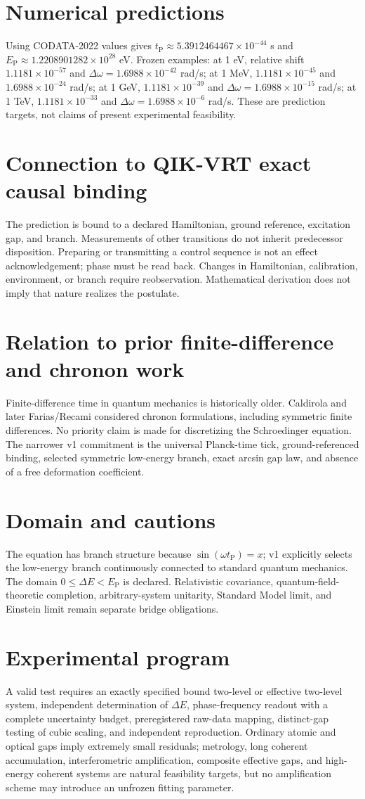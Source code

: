 \documentclass[11pt,a4paper]{article}
\newcommand{\tP}{t_{\mathrm P}}\newcommand{\EP}{E_{\mathrm P}}\newcommand{\dE}{\Delta E}\newcommand{\dw}{\Delta\omega}\newcommand{\repo}{\texttt{Goldkelch/qik-vrt}}
\begin{document}
\section{Numerical predictions}Using CODATA-2022 values gives $\tP\approx5.3912464467\times10^{-44}$ s and $\EP\approx1.2208901282\times10^{28}$ eV. Frozen examples: at 1 eV, relative shift $1.1181\times10^{-57}$ and $\dw=1.6988\times10^{-42}$ rad/s; at 1 MeV, $1.1181\times10^{-45}$ and $1.6988\times10^{-24}$ rad/s; at 1 GeV, $1.1181\times10^{-39}$ and $\dw=1.6988\times10^{-15}$ rad/s; at 1 TeV, $1.1181\times10^{-33}$ and $\dw=1.6988\times10^{-6}$ rad/s. These are prediction targets, not claims of present experimental feasibility.
\section{Connection to QIK-VRT exact causal binding}The prediction is bound to a declared Hamiltonian, ground reference, excitation gap, and branch. Measurements of other transitions do not inherit predecessor disposition. Preparing or transmitting a control sequence is not an effect acknowledgement; phase must be read back. Changes in Hamiltonian, calibration, environment, or branch require reobservation. Mathematical derivation does not imply that nature realizes the postulate.
\section{Relation to prior finite-difference and chronon work}Finite-difference time in quantum mechanics is historically older. Caldirola and later Farias/Recami considered chronon formulations, including symmetric finite differences. No priority claim is made for discretizing the Schroedinger equation. The narrower v1 commitment is the universal Planck-time tick, ground-referenced binding, selected symmetric low-energy branch, exact arcsin gap law, and absence of a free deformation coefficient.
\section{Domain and cautions}The equation has branch structure because $\sin(\omega\tP)=x$; v1 explicitly selects the low-energy branch continuously connected to standard quantum mechanics. The domain $0\le\dE<\EP$ is declared. Relativistic covariance, quantum-field-theoretic completion, arbitrary-system unitarity, Standard Model limit, and Einstein limit remain separate bridge obligations.
\section{Experimental program}A valid test requires an exactly specified bound two-level or effective two-level system, independent determination of $\dE$, phase-frequency readout with a complete uncertainty budget, preregistered raw-data mapping, distinct-gap testing of cubic scaling, and independent reproduction. Ordinary atomic and optical gaps imply extremely small residuals; metrology, long coherent accumulation, interferometric amplification, composite effective gaps, and high-energy coherent systems are natural feasibility targets, but no amplification scheme may introduce an unfrozen fitting parameter.
\end{document}
